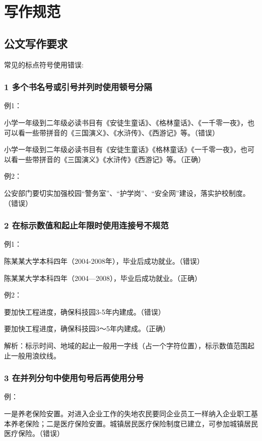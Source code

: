 \chapter{写作规范}


\section{公文写作要求}



常见的标点符号使用错误:



\subsection*{1 多个书名号或引号并列时使用顿号分隔}

例1：

小学一年级到二年级必读书目有《安徒生童话》、《格林童话》、《一千零一夜》，也可以看一些带拼音的《三国演义》、《水浒传》、《西游记》等。（错误）

小学一年级到二年级必读书目有《安徒生童话》《格林童话》《一千零一夜》，也可以看一些带拼音的《三国演义》《水浒传》《西游记》等。（正确）

例2：

公安部门要切实加强校园“警务室”、“护学岗”、“安全网”建设，落实护校制度。（错误）

\subsection*{2 在标示数值和起止年限时使用连接号不规范}

例1：

陈某某大学本科四年（2004-2008年），毕业后成功就业。（错误）

陈某某大学本科四年（2004—2008），毕业后成功就业。（正确）

例2：

要加快工程进度，确保科技园3-5年内建成。（错误）

要加快工程进度，确保科技园3～5年内建成。（正确）

解析：标示时间、地域的起止一般用一字线（占一个字符位置），标示数值范围起止一般用浪纹线。

\subsection*{3 在并列分句中使用句号后再使用分号}

例：

一是养老保险安置。对进入企业工作的失地农民要同企业员工一样纳入企业职工基本养老保险；二是医疗保险安置。城镇居民医疗保险制度已建立，可参加城镇居民医疗保险。（错误）

